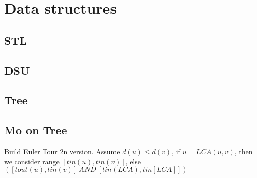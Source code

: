 \chapter{Data structures}

\section{STL}
\section{DSU}
\section{Tree}

\section{Mo on Tree}
  Build Euler Tour 2n version.
  Assume $d(u) \le d(v)$, if $u = LCA(u, v)$, then we consider range $[tin(u), tin(v)]$, else $([tout(u), tin(v)]\ AND\ [tin(LCA), tin[LCA]])$ 
